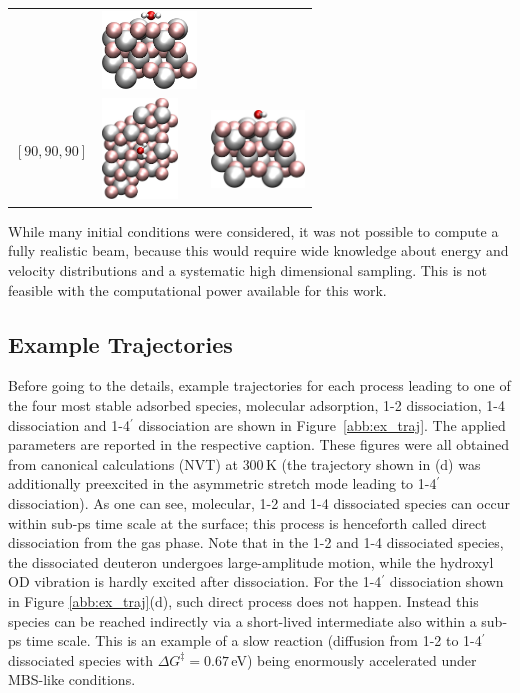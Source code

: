 \documentclass[11pt,DIV=13,BCOR=5mm,a4paper,headinclude]{scrbook}
\begin{document}
\begin{table}[!h]
\begin{tabular}{cp{4cm}p{4cm}}
& \includegraphics[width=2.5cm]{figures/0001/Ausrichtungsbilder/90_90_0-sidetest.png}\\
$[90, 90, 90]$ & \includegraphics[width=2cm,angle=90]{figures/0001/Ausrichtungsbilder/90_90_90-toptest.png} 
& \includegraphics[width=2.5cm]{figures/0001/Ausrichtungsbilder/90_90_90-sidetest.png}\\\bottomrule
\end{tabular}
 \label{tab:orientations}
\end{table}
While many initial conditions were considered, it was not possible to compute a fully realistic beam, because this would require wide knowledge about energy and velocity distributions and a systematic high dimensional sampling.
This is not feasible with the computational power available for this work.
\clearpage
\subsection{Example Trajectories}
Before going to the details, example trajectories for each process leading to one of the four most stable adsorbed species, molecular adsorption, 1-2 dissociation, 1-4 dissociation and 1-4$^\prime$ dissociation are shown in Figure~\ref{abb:ex_traj}.
The applied parameters are reported in the respective caption.
These figures were all obtained from canonical calculations (NVT) at $300\,$K (the trajectory shown in (d) was additionally preexcited in the asymmetric stretch mode leading to 1-4$^\prime$ dissociation).
As one can see, molecular, 1-2 and 1-4 dissociated species can occur within sub-ps time scale at the surface; this process is henceforth called direct dissociation from the gas phase.
Note that in the 1-2 and 1-4 dissociated species, the dissociated deuteron undergoes large-amplitude motion, while the hydroxyl OD vibration is hardly excited after dissociation.
For the 1-4$^\prime$ dissociation shown in Figure \ref{abb:ex_traj}(d), such direct process does not happen.
Instead this species can be reached indirectly via a short-lived intermediate also within a sub-ps time scale. %
This is an example of a slow reaction (diffusion from 1-2 to 1-4$^\prime$ dissociated species with $\Delta G^\ddagger=0.67\,$eV\cite{WirthJPCC2012}) being enormously accelerated under MBS-like conditions.
\end{document}
